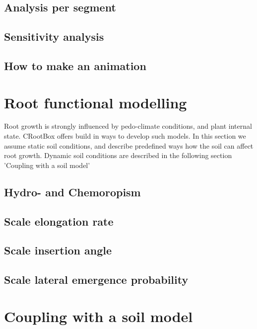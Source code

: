 \documentclass[a4paper]{article}
\begin{document}
\subsection{Analysis per segment}

\subsection{Sensitivity analysis} \label{sec:sa}

\subsection{How to make an animation}




\section{Root functional modelling}

Root growth is strongly influenced by pedo-climate conditions, and plant internal state. 
CRootBox offers build in ways to develop such models. 
In this section we assume static soil conditions, and describe predefined ways how the soil can affect root growth.
Dynamic soil conditions are described in the following section 'Coupling with a soil model'

\subsection{Hydro- and Chemoropism}

\subsection{Scale elongation rate}

\subsection{Scale insertion angle}

\subsection{Scale lateral emergence probability}



\section{Coupling with a soil model}
\end{document}
